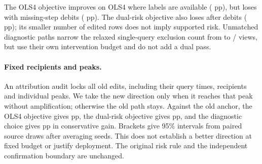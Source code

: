 The OLS4 objective improves on OLS4 where labels are available
(\MovingInitialOLSKnown{} pp), but loses with missing-step debits
(\MovingInitialOLSLower{} pp). The dual-risk objective also loses
after debits (\MovingInitialRiskLower{} pp); its smaller number
of edited rows does not imply supported risk. Unmatched diagnostic
paths narrow the relaxed single-query exclusion count from
\MovingInitialAnchorUpper{} to \MovingInitialRawUpper{}/\MovingInitialViews{}
views, but use their own intervention budget and do not add a dual pass.

\paragraph{Fixed recipients and peaks.}
An attribution audit locks all \MovingInitialEdits{} old edits,
including their query times, recipients and individual peaks. We
take the new direction only when it reaches that peak without
amplification; otherwise the old path stays. Against the old anchor,
the OLS4 objective gives \MovingInitialOLSMatched{} pp, the dual-risk
objective gives \MovingInitialRiskMatched{} pp, and the diagnostic
choice gives \MovingInitialScreenMatched{} pp in conservative gain.
Brackets give 95\% intervals from \MovingInitialBootstrap{} paired
source draws after averaging seeds. This does not establish a better
direction at fixed budget or justify deployment. The original
risk rule and the independent confirmation boundary are unchanged.
